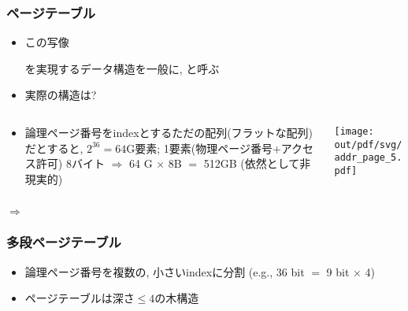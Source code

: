 \documentclass[12pt,dvipdfmx]{beamer}
\begin{document}
\begin{frame}
  \frametitle{ページテーブル}
  \begin{itemize}
  \item この写像

    \begin{center}
    \end{center}

    を実現するデータ構造を一般に, と呼ぶ
      
  \item 実際の構造は?
  \end{itemize}
  
  \begin{columns}
    \begin{column}{0.6\textwidth}
      \begin{itemize}
      \item   論理ページ番号をindexとするただの配列(フラットな配列)だとすると,
        $2^{36} = 64\mbox{G}$要素; 1要素(物理ページ番号$+$アクセス許可) 8バイト
        $\Rightarrow$ 64 G $\times$ 8B $=$ 512GB (依然として非現実的)
      \end{itemize}
    \end{column}
    \begin{column}{0.5\textwidth}
      \begin{center}
        \texttt{[image: out/pdf/svg/addr\_page\_5.pdf]}
      \end{center}
    \end{column}
  \end{columns}

  $\Rightarrow$ 
  
\end{frame}

\begin{frame}
  \frametitle{多段ページテーブル}
  \begin{itemize}
  \item 論理ページ番号を複数の, 小さいindexに分割
    (e.g., 36 bit $=$ 9 bit $\times$ 4)
  \item ページテーブルは深さ$\leq 4$の木構造
    
    
    \begin{center}
    \end{center}
  \end{itemize}
\end{frame}
\end{document}
